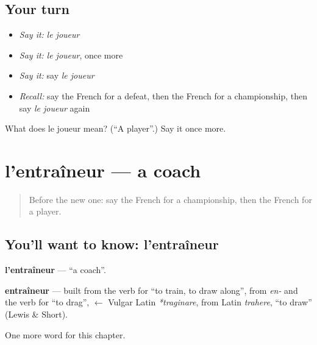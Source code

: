\subsection*{Your turn}
\begin{itemize}
\raggedright
  \item \emph{Say it:} \emph{le joueur}
  \item \emph{Say it:} \emph{le joueur}, once more
  \item \emph{Say it:} say \emph{le joueur}
  \item \emph{Recall:} say the French for a defeat, then the French for a championship, then say \emph{le joueur} again
\end{itemize}

\begin{tcolorbox}[breakable,colback=teal!4,colframe=teal!35!black,title={Before you move on}]
What does le joueur mean? (\textquotedblleft{}A player\textquotedblright{}.) Say it once more.
\end{tcolorbox}
\section[l'entraîneur]{l'entraîneur — a coach}

\label{lesson:FR-C203-entraineur}



\begin{quote}
Before the new one: say the French for a championship, then the French for a player.
\end{quote}

\subsection*{You'll want to know: l'entraîneur}
\textbf{l'entraîneur} — \textquotedblleft{}a coach\textquotedblright{}.

\begin{cousinweb}
\textbf{entraîneur} — built from the verb for \textquotedblleft{}to train, to draw along\textquotedblright{}, from \emph{en-} and the verb for \textquotedblleft{}to drag\textquotedblright{}, $\leftarrow$ Vulgar Latin \emph{*traginare}, from Latin \emph{trahere}, \textquotedblleft{}to draw\textquotedblright{} (Lewis \& Short).
\end{cousinweb}

\begin{grammarlens}[title={What you've built}]
One more word for this chapter.
\end{grammarlens}

